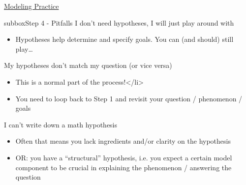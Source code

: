 \begin{textbox}{\href{https://compneuro.neuromatch.io/projects/modelingsteps/ModelingSteps_5through10.html}{Modeling Practice } }
\begin{subbox}{subbox}{Step 4 - Pitfalls }
I don’t need hypotheses, I will just play around with \begin{itemize}
    \item Hypotheses help determine and specify goals. You can (and should) still play… \end{itemize}

My hypotheses don’t match my question (or vice versa)
 \begin{itemize}
    \item This is a normal part of the process!</li>
\item You need to loop back to Step 1 and revisit your question / phenomenon / goals \end{itemize}

I can’t write down a math hypothesis
\begin{itemize}
    \item Often that means you lack ingredients and/or clarity on the hypothesis
  \item OR: you have a “structural” hypothesis, i.e. you expect a certain model component to be crucial in explaining the phenomenon / answering the question \end{itemize}

 \end{subbox}
 
 
\end{textbox}

